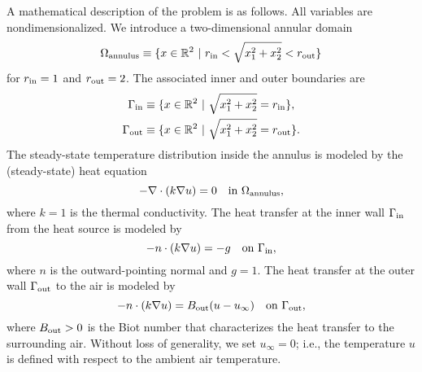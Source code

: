 \documentclass[preprint,11pt]{article}
\begin{document}
A mathematical description of the problem is as follows.  All variables are nondimensionalized.  We introduce a two-dimensional annular domain
\begin{equation*}
  \Omega_{\rm annulus} \equiv \{ x \in \mathbb{R}^2 \ | \ r_{\rm in} < \sqrt{x_1^2 + x_2^2} < r_{\rm out} \}
\end{equation*}
for $r_{\rm in} = 1$ and $r_{\rm out} = 2$. The associated inner and outer boundaries are
\begin{align*}
  \Gamma_{\rm in} &\equiv \{ x \in \mathbb{R}^2 \ | \ \sqrt{x_1^2 + x_2^2} = r_{\rm in} \}, \\
  \Gamma_{\rm out} &\equiv \{ x \in \mathbb{R}^2 \ | \ \sqrt{x_1^2 + x_2^2} = r_{\rm out} \}.
\end{align*}
The steady-state temperature distribution inside the annulus is modeled by the (steady-state) heat equation
\begin{equation*}
  - \nabla \cdot (k \nabla u) = 0 \quad \text{in } \Omega_{\rm annulus} ,
\end{equation*}
where $k = 1$ is the thermal conductivity. The heat transfer at the inner wall $\Gamma_{\rm in}$ from the heat source is modeled by
\begin{equation*}
  - n \cdot (k \nabla u) = -g \quad \text{on } \Gamma_{\rm in},
\end{equation*}
where $n$ is the outward-pointing normal and $g = 1$. %
The heat transfer at the outer wall $\Gamma_{\rm out}$ to the air is modeled by 
\begin{equation*}
  - n \cdot (k \nabla u) = B_{\rm out} (u - u_{\infty})  \quad \text{on } \Gamma_{\rm out},
\end{equation*}
where $B_{\rm out} > 0$ is the Biot number that characterizes the heat transfer to the surrounding air.  Without loss of generality, we set $u_{\infty} = 0$; i.e., the temperature $u$ is defined with respect to the ambient air temperature.
\end{document}
